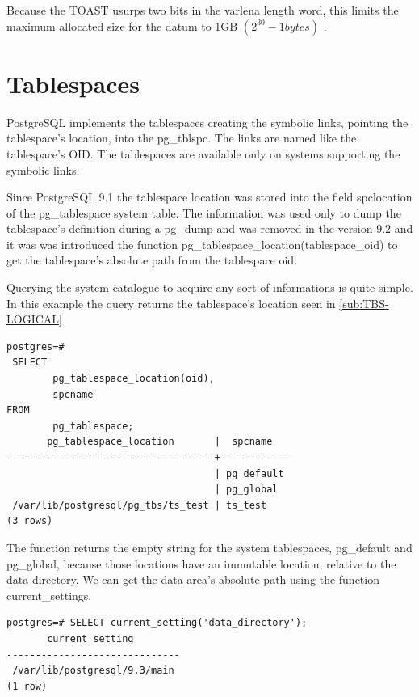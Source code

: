 Because the TOAST usurps two bits in the varlena length word, this limits the maximum allocated 
size 
for the datum to 1GB \begin{math} (2^{30} -1 bytes) \end{math} .

\section{Tablespaces}
\label{sub:TBS-PHYSICAL}
PostgreSQL implements the tablespaces creating the symbolic links, pointing the tablespace's 
location, into the pg\_tblspc. The links are named like the tablespace's OID. The tablespaces are 
available only on systems supporting the symbolic links.\newline

Since PostgreSQL 9.1 the tablespace location was stored into the field spclocation of the 
pg\_tablespace system table. The information was used only to dump the 
tablespace's definition during a pg\_dump and was removed in the version 9.2 and it was was 
introduced the function pg\_tablespace\_location(tablespace\_oid) to get the tablespace's absolute 
path from the tablespace oid.\newline

Querying the system catalogue to acquire any sort of informations is quite  simple. In this example 
the query returns the tablespace's location seen in \ref{sub:TBS-LOGICAL} 

\begin{lstlisting}[style=pgsql]
 postgres=# 
 SELECT 
        pg_tablespace_location(oid),
        spcname 
FROM 
        pg_tablespace;
       pg_tablespace_location       |  spcname   
------------------------------------+------------
                                    | pg_default
                                    | pg_global
 /var/lib/postgresql/pg_tbs/ts_test | ts_test
(3 rows)

\end{lstlisting}

The function returns the empty string for the system tablespaces, pg\_default and pg\_global, 
because those locations have an immutable location, relative to the data directory. We can get the 
data area's absolute path using the function current\_settings. 

\begin{lstlisting}[style=pgsql]
 postgres=# SELECT current_setting('data_directory');
       current_setting        
------------------------------
 /var/lib/postgresql/9.3/main
(1 row)

\end{lstlisting}


